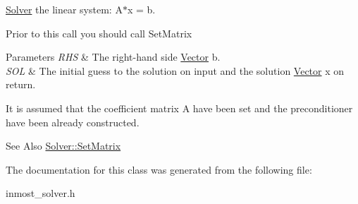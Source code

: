 \hyperlink{classINMOST_1_1Solver}{Solver} the linear system\-: A$\ast$x = b. 

Prior to this call you should call Set\-Matrix


\begin{DoxyParams}{Parameters}
{\em R\-H\-S} & The right-\/hand side \hyperlink{classINMOST_1_1Solver_1_1Vector}{Vector} b. \\
\hline
{\em S\-O\-L} & The initial guess to the solution on input and the solution \hyperlink{classINMOST_1_1Solver_1_1Vector}{Vector} x on return.\\
\hline
\end{DoxyParams}
It is assumed that the coefficient matrix A have been set and the preconditioner have been already constructed.

\begin{DoxySeeAlso}{See Also}
\hyperlink{classINMOST_1_1Solver_a8e70ae0ef4eaa220d1db45089b4df1ff}{Solver\-::\-Set\-Matrix} 
\end{DoxySeeAlso}


The documentation for this class was generated from the following file\-:\begin{DoxyCompactItemize}
\item 
inmost\-\_\-solver.\-h\end{DoxyCompactItemize}
